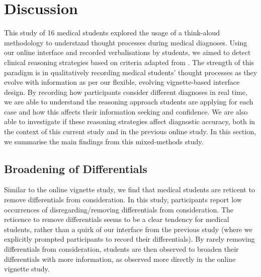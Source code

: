 \documentclass[a4paper, nobind]{templates/ociamthesis}
\begin{document}
\section{Discussion}\label{discussion-2}

This study of 16 medical students explored the usage of a think-aloud methodology to understand thought processes during medical diagnoses. Using our online interface and recorded verbalisations by students, we aimed to detect clinical reasoning strategies based on criteria adapted from \textcite{coderre_diagnostic_2003}. The strength of this paradigm is in qualitatively recording medical students' thought processes as they evolve with information as per our flexible, evolving vignette-based interface design. By recording how participants consider different diagnoses in real time, we are able to understand the reasoning approach students are applying for each case and how this affects their information seeking and confidence. We are also able to investigate if these reasoning strategies affect diagnostic accuracy, both in the context of this current study and in the previous online study. In this section, we summarise the main findings from this mixed-methods study.

\subsection{Broadening of Differentials}\label{broadening-of-differentials-1}

Similar to the online vignette study, we find that medical students are reticent to remove differentials from consideration. In this study, participants report low occurrences of disregarding/removing differentials from consideration. The reticence to remove differentials seems to be a clear tendency for medical students, rather than a quirk of our interface from the previous study (where we explicitly prompted participants to record their differentials). By rarely removing differentials from consideration, students are then observed to broaden their differentials with more information, as observed more directly in the online vignette study.\\
\end{document}
